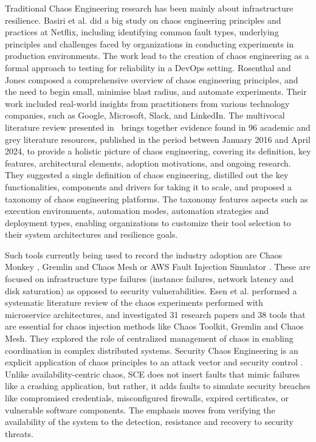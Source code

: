 \documentclass[pdflatex,sn-mathphys-num]{sn-jnl}%
\theoremstyle{thmstyleone}%
\theoremstyle{thmstyletwo}%
\theoremstyle{thmstylethree}%
\begin{document}
	Traditional Chaos Engineering research has been mainly about infrastructure resilience. Basiri et al. \cite{basiri2016chaos} did a big study on chaos engineering principles and practices at Netflix, including identifying common fault types, underlying principles and challenges faced by organizations in conducting experiments in production environments. The work lead to the creation of chaos engineering as a formal approach to testing for reliability in a DevOps setting. Rosenthal and Jones \cite{rosenthal2020chaos} composed a comprehensive overview of chaos engineering principles, and the need to begin small, minimise blast radius, and automate experiments. Their work included real-world insights from practitioners from various technology companies, such as Google, Microsoft, Slack, and LinkedIn. The multivocal literature review presented in~\cite{owotogbe2025chaos} brings together evidence found in 96 academic and grey literature resources, published in the period between January 2016 and April 2024, to provide a holistic picture of chaos engineering, covering its definition, key features, architectural elements, adoption motivations, and ongoing research. They suggested a single definition of chaos engineering, distilled out the key functionalities, components and drivers for taking it to scale, and proposed a taxonomy of chaos engineering platforms. The taxonomy features aspects such as execution environments, automation modes, automation strategies and deployment types, enabling organizations to customize their tool selection to their system architectures and resilience goals. 
	
	Such tools currently being used to record the industry adoption are Chaos Monkey \cite{basiri2016chaos}, Gremlin \cite{gremlin2022} and Chaos Mesh \cite{chaosmesh2021} or AWS Fault Injection Simulator \cite{awsfis2023}. These are focused on infrastructure type failures (instance failures, network latency and disk saturation) as opposed to security vulnerabilities. Esen et al. \cite{esen2025chaos} performed a systematic literature review of the chaos experiments performed with microservice architectures, and investigated 31 research papers and 38 tools that are essential for chaos injection methods like Chaos Toolkit, Gremlin and Chaos Mesh. They explored the role of centralized management of chaos in enabling coordination in complex distributed systems. Security Chaos Engineering is an explicit application of chaos principles to an attack vector and security control \cite{myrbakken2021security}. Unlike availability-centric chaos, SCE does not insert faults that mimic failures like a crashing application, but rather, it adds faults to simulate security breaches like compromised credentials, misconfigured firewalls, expired certificates, or vulnerable software components. The emphasis moves from verifying the availability of the system to the detection, resistance and recovery to security threats. 
	
\end{document}
